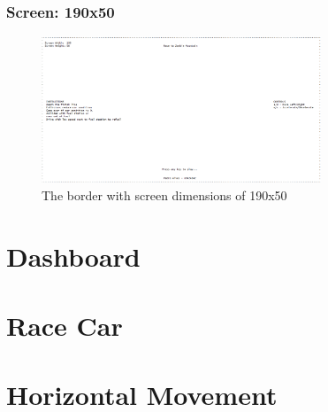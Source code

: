 \documentclass{article}
\begin{document}
\subsubsection*{Screen: 190x50}
\begin{figure}[h]
	\begin{center}
	\includegraphics[width=0.745\textwidth]{images/border_190x50}
	\caption{The border with screen dimensions of 190x50}
	\label{fig:border_190x50} 
	\end{center}
\end{figure}

\clearpage
\section{Dashboard}
\clearpage

\section{Race Car}

\clearpage

\section{Horizontal Movement}

\clearpage

\end{document}
